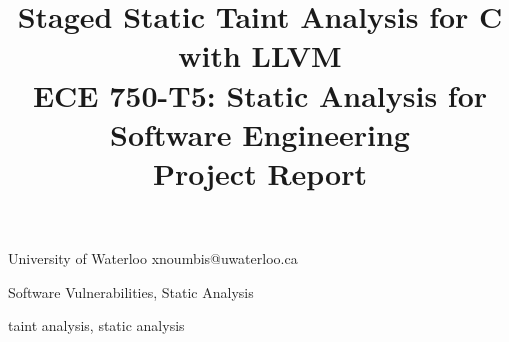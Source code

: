 \documentclass{sigplanconf}
\begin{document}


\title{Staged Static Taint Analysis for C with LLVM\\
	   ECE 750-T5: Static Analysis for Software Engineering\\
	   Project Report}

\date{}

           {University of Waterloo}
           {xnoumbis@uwaterloo.ca}

\maketitle




\terms
Software Vulnerabilities, Static Analysis

\keywords
taint analysis, static analysis

















\appendix












\end{document}
